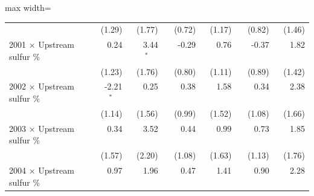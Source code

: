 \begin{table}[htbp]
{\begin{adjustbox}{max width=\linewidth}
\begin{tabular}{lrrrrrr}
 & (\phantom{-}1.29)\phantom{$^{***}$} & (\phantom{-}1.77)\phantom{$^{***}$} & (\phantom{-}0.72)\phantom{$^{***}$} & (\phantom{-}1.17)\phantom{$^{***}$} & (\phantom{-}0.82)\phantom{$^{***}$} & (\phantom{-}1.46)\phantom{$^{***}$} \\
2001 $\times$ Upstream sulfur \% & \phantom{(}\phantom{-}0.24$^{\phantom{*}\phantom{*}\phantom{*}}$ & \phantom{(}\phantom{-}3.44$^{*\phantom{*}\phantom{*}}$ & \phantom{(}-0.29$^{\phantom{*}\phantom{*}\phantom{*}}$ & \phantom{(}\phantom{-}0.76$^{\phantom{*}\phantom{*}\phantom{*}}$ & \phantom{(}-0.37$^{\phantom{*}\phantom{*}\phantom{*}}$ & \phantom{(}\phantom{-}1.82$^{\phantom{*}\phantom{*}\phantom{*}}$ \\
 & (\phantom{-}1.23)\phantom{$^{***}$} & (\phantom{-}1.76)\phantom{$^{***}$} & (\phantom{-}0.80)\phantom{$^{***}$} & (\phantom{-}1.11)\phantom{$^{***}$} & (\phantom{-}0.89)\phantom{$^{***}$} & (\phantom{-}1.42)\phantom{$^{***}$} \\
2002 $\times$ Upstream sulfur \% & \phantom{(}-2.21$^{*\phantom{*}\phantom{*}}$ & \phantom{(}\phantom{-}0.25$^{\phantom{*}\phantom{*}\phantom{*}}$ & \phantom{(}\phantom{-}0.38$^{\phantom{*}\phantom{*}\phantom{*}}$ & \phantom{(}\phantom{-}1.58$^{\phantom{*}\phantom{*}\phantom{*}}$ & \phantom{(}\phantom{-}0.34$^{\phantom{*}\phantom{*}\phantom{*}}$ & \phantom{(}\phantom{-}2.38$^{\phantom{*}\phantom{*}\phantom{*}}$ \\
 & (\phantom{-}1.14)\phantom{$^{***}$} & (\phantom{-}1.56)\phantom{$^{***}$} & (\phantom{-}0.99)\phantom{$^{***}$} & (\phantom{-}1.52)\phantom{$^{***}$} & (\phantom{-}1.08)\phantom{$^{***}$} & (\phantom{-}1.66)\phantom{$^{***}$} \\
2003 $\times$ Upstream sulfur \% & \phantom{(}\phantom{-}0.34$^{\phantom{*}\phantom{*}\phantom{*}}$ & \phantom{(}\phantom{-}3.52$^{\phantom{*}\phantom{*}\phantom{*}}$ & \phantom{(}\phantom{-}0.44$^{\phantom{*}\phantom{*}\phantom{*}}$ & \phantom{(}\phantom{-}0.99$^{\phantom{*}\phantom{*}\phantom{*}}$ & \phantom{(}\phantom{-}0.73$^{\phantom{*}\phantom{*}\phantom{*}}$ & \phantom{(}\phantom{-}1.85$^{\phantom{*}\phantom{*}\phantom{*}}$ \\
 & (\phantom{-}1.57)\phantom{$^{***}$} & (\phantom{-}2.20)\phantom{$^{***}$} & (\phantom{-}1.08)\phantom{$^{***}$} & (\phantom{-}1.63)\phantom{$^{***}$} & (\phantom{-}1.13)\phantom{$^{***}$} & (\phantom{-}1.76)\phantom{$^{***}$} \\
2004 $\times$ Upstream sulfur \% & \phantom{(}\phantom{-}0.97$^{\phantom{*}\phantom{*}\phantom{*}}$ & \phantom{(}\phantom{-}1.96$^{\phantom{*}\phantom{*}\phantom{*}}$ & \phantom{(}\phantom{-}0.47$^{\phantom{*}\phantom{*}\phantom{*}}$ & \phantom{(}\phantom{-}1.41$^{\phantom{*}\phantom{*}\phantom{*}}$ & \phantom{(}\phantom{-}0.90$^{\phantom{*}\phantom{*}\phantom{*}}$ & \phantom{(}\phantom{-}2.28$^{\phantom{*}\phantom{*}\phantom{*}}$ \\

\end{tabular}
\end{adjustbox}}
\end{table}

